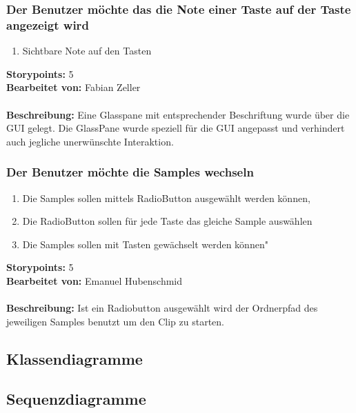 \subsubsection{Der Benutzer möchte das die Note einer Taste auf der Taste angezeigt wird}

\begin{enumerate}
 \item Sichtbare Note auf den Tasten
\end{enumerate}

\textbf{Storypoints:} 5 \\
\textbf{Bearbeitet von:} Fabian Zeller \\
\\
\textbf{Beschreibung:} Eine Glasspane mit entsprechender Beschriftung wurde über die GUI gelegt. Die GlassPane wurde speziell für die GUI angepasst und verhindert auch jegliche unerwünschte Interaktion.


\subsubsection{Der Benutzer möchte die Samples wechseln}

\begin{enumerate}
 \item Die Samples sollen mittels RadioButton ausgewählt werden können,
 \item Die RadioButton sollen für jede Taste das gleiche Sample auswählen
 \item Die Samples sollen mit Tasten gewächselt werden können"
\end{enumerate}

\textbf{Storypoints:} 5 \\
\textbf{Bearbeitet von:} Emanuel Hubenschmid \\
\\
\textbf{Beschreibung:} Ist ein Radiobutton ausgewählt wird der Ordnerpfad 
des jeweiligen Samples benutzt um den Clip zu starten.


\newpage


\subsection{Klassendiagramme}
\subsection{Sequenzdiagramme}


